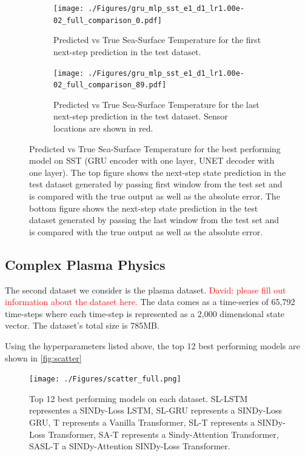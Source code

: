 \documentclass[11pt, a4paper]{article}
\begin{document}
\begin{figure}[H]
    \centering
    \begin{subfigure}[t]{\textwidth}
        \centering
        \texttt{[image: ./Figures/gru\_mlp\_sst\_e1\_d1\_lr1.00e-02\_full\_comparison\_0.pdf]}
        \caption{Predicted vs True Sea-Surface Temperature for the first next-step prediction in the test dataset.}\label{fig:sst_full_0}
    \end{subfigure}
    \begin{subfigure}[t]{\textwidth}
        \centering
        \texttt{[image: ./Figures/gru\_mlp\_sst\_e1\_d1\_lr1.00e-02\_full\_comparison\_89.pdf]}
        \caption{Predicted vs True Sea-Surface Temperature for the last next-step prediction in the test dataset. Sensor locations are shown in red.}\label{fig:sst_full_89}
    \end{subfigure}
    \caption{Predicted vs True Sea-Surface Temperature for the best performing model on SST (GRU encoder with one layer, UNET decoder with one layer). The top figure shows the next-step state prediction in the test dataset generated by passing first window from the test set and is compared with the true output as well as the absolute error. The bottom figure shows the next-step state prediction in the test dataset generated by passing the last window from the test set and is compared with the true output as well as the absolute error.}\label{fig:sst_full}
\end{figure}

\subsection{Complex Plasma Physics}


The second dataset we consider is the plasma dataset. \textcolor{red}{David: please fill out information about the dataset here.} The data comes as a time-series of 65,792 time-steps where each time-step is represented as a 2,000 dimensional state vector. The dataset's total size is 785MB.

Using the hyperparameters listed above, the top 12 best performing models are shown in \autoref{fig:scatter}

\begin{figure}[H]
\centering
\texttt{[image: ./Figures/scatter\_full.png]}
\caption{Top 12 best performing models on each dataset. SL-LSTM representes a SINDy-Loss LSTM, SL-GRU represents a SINDy-Loss GRU, T represents a Vanilla Transformer, SL-T represents a SINDy-Loss Transformer, SA-T represents a Sindy-Attention Transformer, SASL-T a SINDy-Attention SINDy-Loss Transformer.}\label{fig:scatter}
\end{figure}
\end{document}
